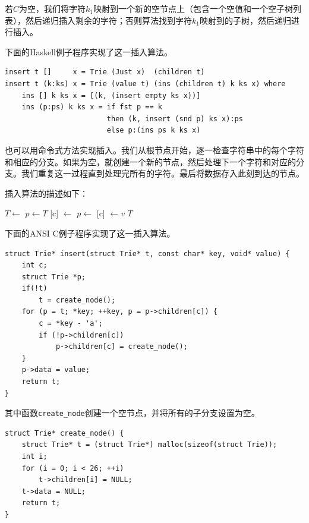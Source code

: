\documentclass[b5paper]{ctexart}
\begin{document}
若$C$为空，我们将字符$k_1$映射到一个新的空节点上（包含一个空值和一个空子树列表），然后递归插入剩余的字符；否则算法找到字符$k_1$映射到的子树，然后递归进行插入。

下面的Haskell例子程序实现了这一插入算法。

\lstset{language=Haskell}
\begin{lstlisting}[style=Haskell]
insert t []     x = Trie (Just x)  (children t)
insert t (k:ks) x = Trie (value t) (ins (children t) k ks x) where
    ins [] k ks x = [(k, (insert empty ks x))]
    ins (p:ps) k ks x = if fst p == k
                        then (k, insert (snd p) ks x):ps
                        else p:(ins ps k ks x)
\end{lstlisting}

也可以用命令式方法实现插入。我们从根节点开始，逐一检查字符串中的每个字符和相应的分支。如果为空，就创建一个新的节点，然后处理下一个字符和对应的分支。我们重复这一过程直到处理完所有的字符。最后将数据存入此刻到达的节点。

插入算法的描述如下：

\begin{algorithmic}[1]
    \State $T \gets $ 
  \EndIf
  \State $p \gets T$
      \State {}[c] $\gets$ 
    \EndIf
    \State $p \gets $ [c]
  \EndFor
  \State {} $\gets v$
  \State \Return $T$
\EndFunction
\end{algorithmic}

下面的ANSI C例子程序实现了这一插入算法。

\lstset{language=C}
\begin{lstlisting}
struct Trie* insert(struct Trie* t, const char* key, void* value) {
    int c;
    struct Trie *p;
    if(!t)
        t = create_node();
    for (p = t; *key; ++key, p = p->children[c]) {
        c = *key - 'a';
        if (!p->children[c])
            p->children[c] = create_node();
    }
    p->data = value;
    return t;
}
\end{lstlisting}

其中函数\texttt{create\_node}创建一个空节点，并将所有的子分支设置为空。

\begin{lstlisting}
struct Trie* create_node() {
    struct Trie* t = (struct Trie*) malloc(sizeof(struct Trie));
    int i;
    for (i = 0; i < 26; ++i)
        t->children[i] = NULL;
    t->data = NULL;
    return t;
}
\end{lstlisting}
\end{document}

